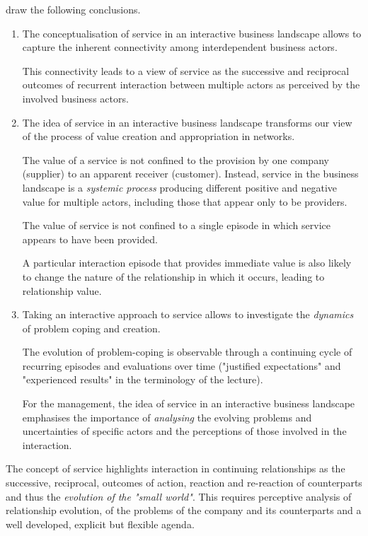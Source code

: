 \documentclass[11pt,a4paper]{article}
\begin{document}
\cite{FordMouzas2013} draw the following conclusions.
\begin{enumerate}
\item The conceptualisation of service in an interactive business landscape
  allows to capture the inherent connectivity among interdependent business
  actors.

  This connectivity leads to a view of service as the successive and
  reciprocal outcomes of recurrent interaction between multiple actors as
  perceived by the involved business actors.

\item The idea of service in an interactive business landscape transforms our
  view of the process of value creation and appropriation in networks.

  The value of a service is not conﬁned to the provision by one company
  (supplier) to an apparent receiver (customer).  Instead, service in the
  business landscape is a \emph{systemic process} producing different positive
  and negative value for multiple actors, including those that appear only to
  be providers.
  
  The value of service is not conﬁned to a single episode in which service
  appears to have been provided.

  A particular interaction episode that provides immediate value is also
  likely to change the nature of the relationship in which it occurs, leading
  to relationship value.

\item Taking an interactive approach to service allows to investigate the
  \emph{dynamics} of problem coping and creation.

  The evolution of problem-coping is observable through a continuing cycle of
  recurring episodes and evaluations over time ("justified expectations" and
  "experienced results" in the terminology of the lecture).

  For the management, the idea of service in an interactive business landscape
  emphasises the importance of \emph{analysing} the evolving problems and
  uncertainties of speciﬁc actors and the perceptions of those involved in the
  interaction.
\end{enumerate}

The concept of service highlights interaction in continuing relationships as
the successive, reciprocal, outcomes of action, reaction and re-reaction of
counterparts and thus the \emph{evolution of the "small world"}.  This
requires perceptive analysis of relationship evolution, of the problems of the
company and its counterparts and a well developed, explicit but ﬂexible
agenda.
\end{document}
